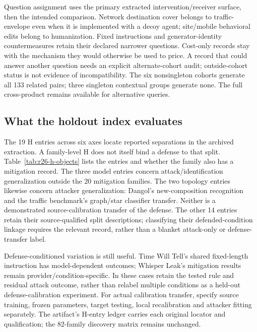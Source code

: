 

Question assignment uses the primary extracted intervention/receiver surface, then the intended comparison. Network destination cover belongs to traffic-envelope even when it is implemented with a decoy agent; site/mobile behavioral edits belong to humanization. Fixed instructions and generator-identity countermeasures retain their declared narrower questions. Cost-only records stay with the mechanism they would otherwise be used to price. A record that could answer another question needs an explicit alternate-cohort audit; outside-cohort status is not evidence of incompatibility. The six nonsingleton cohorts generate all 133 related pairs; three singleton contextual groups generate none. The full cross-product remains available for alternative queries.

\subsection{What the holdout index evaluates}
The 19 H entries across six axes locate reported separations in the archived extraction. A family-level H does not itself bind a defense to that split. Table~\ref{tab:r26-h-objects} lists the entries and whether the family also has a mitigation record. The three model entries concern attack/identification generalization outside the 20 mitigation families. The two topology entries likewise concern attacker generalization: Dangol's new-composition recognition and the traffic benchmark's graph/star classifier transfer. Neither is a demonstrated source-calibration transfer of the defense. The other 14 entries retain their source-qualified split descriptions; classifying their defended-condition linkage requires the relevant record, rather than a blanket attack-only or defense-transfer label.

Defense-conditioned variation is still useful. Time Will Tell's shared fixed-length instruction has model-dependent outcomes; Whisper Leak's mitigation results remain provider/condition-specific. In these cases retain the tested rule and residual attack outcome, rather than relabel multiple conditions as a held-out defense-calibration experiment. For actual calibration transfer, specify source training, frozen parameters, target testing, local recalibration and attacker fitting separately. The artifact's H-entry ledger carries each original locator and qualification; the 82-family discovery matrix remains unchanged.


